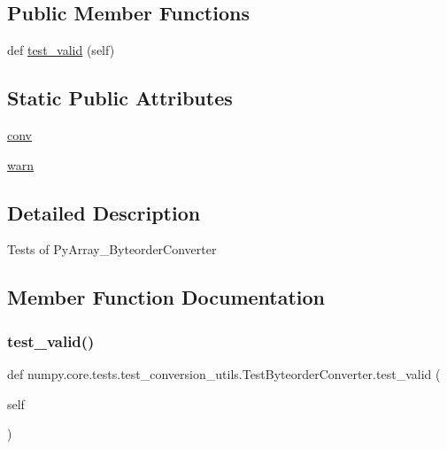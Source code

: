 \subsection*{Public Member Functions}
\begin{DoxyCompactItemize}
\item 
def \hyperlink{classnumpy_1_1core_1_1tests_1_1test__conversion__utils_1_1TestByteorderConverter_aadd7ff59f9c4912c1e8f1ab985be8c8d}{test\+\_\+valid} (self)
\end{DoxyCompactItemize}
\subsection*{Static Public Attributes}
\begin{DoxyCompactItemize}
\item 
\hyperlink{classnumpy_1_1core_1_1tests_1_1test__conversion__utils_1_1TestByteorderConverter_a2230cb882e7ec5cc96bf19329334e437}{conv}
\item 
\hyperlink{classnumpy_1_1core_1_1tests_1_1test__conversion__utils_1_1TestByteorderConverter_a0ccefe85384acd6da8445cf048421ff1}{warn}
\end{DoxyCompactItemize}


\subsection{Detailed Description}
\begin{DoxyVerb}Tests of PyArray_ByteorderConverter \end{DoxyVerb}
 

\subsection{Member Function Documentation}
\mbox{\label{classnumpy_1_1core_1_1tests_1_1test__conversion__utils_1_1TestByteorderConverter_aadd7ff59f9c4912c1e8f1ab985be8c8d}} 
\subsubsection{\texorpdfstring{test\+\_\+valid()}{test\_valid()}}
{\footnotesize\ttfamily def numpy.\+core.\+tests.\+test\+\_\+conversion\+\_\+utils.\+Test\+Byteorder\+Converter.\+test\+\_\+valid (\begin{DoxyParamCaption}\item[{}]{self }\end{DoxyParamCaption})}



